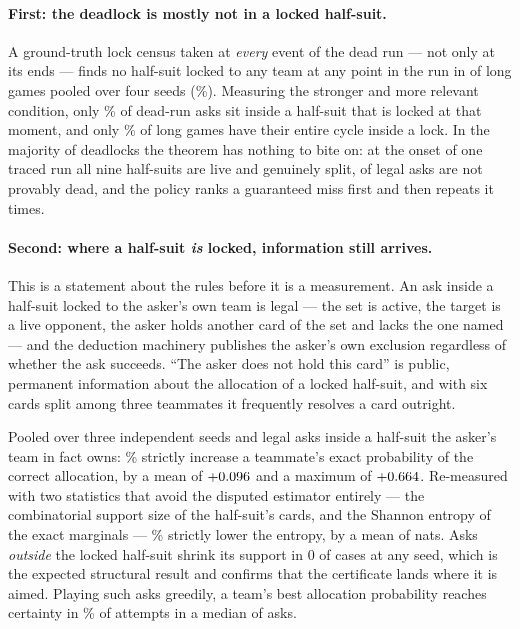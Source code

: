 \paragraph{First: the deadlock is mostly not in a locked half-suit.} A ground-truth
lock census taken at \emph{every} event of the dead run --- not only at its ends
--- finds no half-suit locked to any team at any point in the run in
\numNoLockPooled{} of \numNoLockPooledN{} long games pooled over four seeds
(\numNoLockPct\%). Measuring the stronger and more relevant condition, only
\numRunAsksLocked\% of dead-run asks sit inside a half-suit that is locked at that
moment, and only \numCycleInLock\% of long games have their entire cycle inside a
lock. In the majority of deadlocks the theorem has nothing to bite on: at the
onset of one traced run all nine half-suits are live and genuinely split,
\numTraceLive{} of \numTraceLegal{} legal asks are not provably dead, and the
policy ranks a guaranteed miss first and then repeats it \numTraceRepeats{}
times.

\paragraph{Second: where a half-suit \emph{is} locked, information still arrives.}
This is a statement about the rules before it is a measurement. An ask inside a
half-suit locked to the asker's own team is legal --- the set is active, the
target is a live opponent, the asker holds another card of the set and lacks the
one named --- and the deduction machinery publishes the asker's own exclusion
regardless of whether the ask succeeds. ``The asker does not hold this card'' is
public, permanent information about the allocation of a locked half-suit, and
with six cards split among three teammates it frequently resolves a card
outright.

Pooled over three independent seeds and \numCertN{} legal asks inside a
half-suit the asker's team in fact owns: \numCertRate\% strictly increase a
teammate's exact probability of the correct allocation, by a mean of
$+0.096$ and a maximum of $+0.664$. Re-measured with two statistics
that avoid the disputed estimator entirely --- the combinatorial support size of
the half-suit's cards, and the Shannon entropy of the exact marginals ---
\numEntropyRate\% strictly lower the entropy, by a mean of \numEntropyMean{}
nats. Asks \emph{outside} the locked half-suit shrink its support in
0 of \numOutsideSupport{} cases at any seed, which is the expected structural
result and confirms that the certificate lands where it is aimed. Playing such
asks greedily, a team's best allocation probability reaches certainty in
\numLadderRate\% of attempts in a median of \numLadderMedian{} asks.


